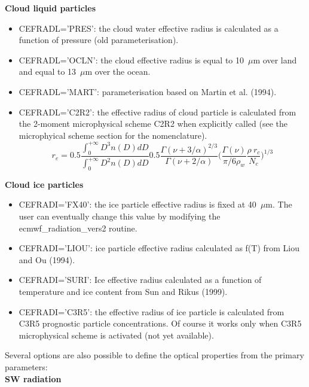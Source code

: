 {\bf Cloud liquid particles}\\
\begin{itemize}

\item CEFRADL='PRES': the cloud water effective radius is calculated as a function of pressure (old parameterisation).

\item CEFRADL='OCLN': the cloud effective radius is equal to 10~$\mu$m over land and equal to 13~$\mu$m over the ocean.

\item CEFRADL='MART': parameterisation based on Martin et al. (1994).

        \item CEFRADL='C2R2': the effective radius of cloud particle is calculated from the 2-moment microphysical scheme C2R2 when explicitly called (see the microphyical scheme section for the nomenclature).
$$ r_{e}=0.5\frac{\int_0^{+\infty} D^3 n(D) dD}{\int_0^{+\infty} D^2 n(D) dD}0.5\frac{\Gamma(\nu+3/\alpha)^{2/3}}{\Gamma(\nu+2/\alpha)}\Big(\frac{\Gamma(\nu)}{\pi/6 \rho_w}\frac{\rho\ r_c}{N_c}\Big)^{1/3}$$
\end{itemize}

{\bf Cloud ice particles}\\
\begin{itemize}
\item CEFRADI='FX40': the ice particle effective radius is fixed at 40~$\mu$m. The user can eventually change this value by modifying the ecmwf\_radiation\_vers2 routine.

\item CEFRADI='LIOU': ice particle effective radius calculated as f(T) from Liou and Ou (1994).

\item CEFRADI='SURI': Ice effective radius calculated as a function of temperature and ice content from Sun and Rikus (1999).

\item CEFRADI='C3R5': the effective radius of ice particle is calculated from C3R5 prognostic particle concentrations. Of course it works only when C3R5 microphysical scheme is activated (not yet available). \\
\end{itemize}

Several options are also possible to define the optical properties from the primary parameters: \\

{\bf SW radiation}\\


